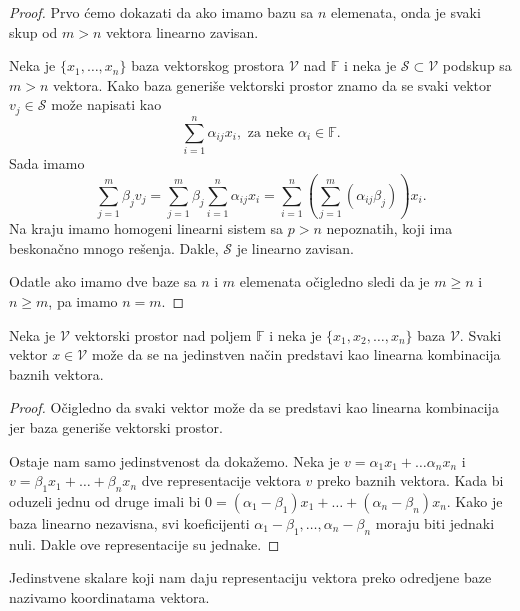 \documentclass{article}
\begin{document}
\begin{proof}
  Prvo ćemo dokazati da ako imamo bazu sa $n$ elemenata, onda je svaki skup od $m > n$ vektora linearno zavisan.
  
  Neka je $\{x_1, \ldots, x_n\}$ baza vektorskog prostora $\mathcal{V}$ nad $\mathbb{F}$ i neka je $\mathcal{S} \subset \mathcal{V}$ podskup sa $m > n$ vektora.
  Kako baza generiše vektorski prostor znamo da se svaki vektor $v_j \in \mathcal{S}$ može napisati kao
  \[\sum_{i = 1}^{n} \alpha_{ij} x_i, \text{ za neke } \alpha_i \in \mathbb{F}.\]
  Sada imamo
  \[\sum_{j = 1}^{m} \beta_j v_j = \sum_{j = 1}^{m} \beta_j \sum_{i = 1}^{n} \alpha_{ij} x_i = \sum_{i = 1}^{n} (\sum_{j = 1}^{m} (\alpha_{ij} \beta_j)) x_i.\]
  Na kraju imamo homogeni linearni sistem sa $p > n$ nepoznatih, koji ima beskonačno mnogo rešenja.
  Dakle, $\mathcal{S}$ je linearno zavisan.

  Odatle ako imamo dve baze sa $n$ i $m$ elemenata očigledno sledi da je $m \ge n$ i $n \ge m$, pa imamo $n = m$.
\end{proof}

\begin{theorem}
  Neka je $\mathcal{V}$ vektorski prostor nad poljem $\mathbb{F}$ i neka je $\{x_1, x_2, \ldots, x_n\}$ baza $\mathcal{V}$.
  Svaki vektor $x \in \mathcal{V}$ može da se na jedinstven način predstavi kao linearna kombinacija baznih vektora.
\end{theorem}

\begin{proof}
  Očigledno da svaki vektor može da se predstavi kao linearna kombinacija jer baza generiše vektorski prostor.

  Ostaje nam samo jedinstvenost da dokažemo.
  Neka je $v = \alpha_1 x_1 + \ldots \alpha_n x_n$ i $ v = \beta_1 x_1 + \ldots + \beta_n x_n$ dve representacije vektora $v$ preko baznih vektora.
  Kada bi oduzeli jednu od druge imali bi $0 = (\alpha_1 - \beta_1) x_1 + \ldots + (\alpha_n - \beta_n) x_n$.
  Kako je baza linearno nezavisna, svi koeficijenti $\alpha_1 - \beta_1, \ldots, \alpha_n - \beta_n$ moraju biti jednaki nuli.
  Dakle ove representacije su jednake.
\end{proof}

Jedinstvene skalare koji nam daju representaciju vektora preko odredjene baze nazivamo koordinatama vektora.
\end{document}
